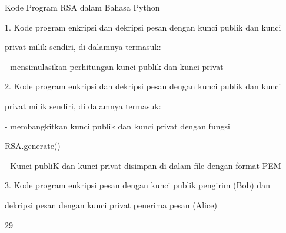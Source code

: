 \documentclass{article}
\begin{document}

Kode Program RSA dalam Bahasa Python

1. Kode program enkripsi dan dekripsi pesan dengan kunci publik dan kunci 

privat milik sendiri, di dalamnya termasuk:


- mensimulasikan perhitungan kunci publik dan kunci privat



2. Kode program enkripsi dan dekripsi pesan dengan kunci publik dan kunci 

privat milik sendiri, di dalamnya termasuk:


- membangkitkan kunci publik dan kunci privat dengan fungsi 


  RSA.generate()


- Kunci publiK dan kunci privat disimpan di dalam file  dengan format PEM

3.   Kode program enkripsi pesan dengan kunci publik pengirim (Bob) dan 

dekripsi pesan dengan kunci privat penerima pesan (Alice)

29
\end{document}
